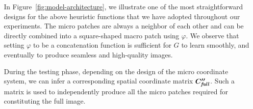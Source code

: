 \documentclass{article}
\makeatletter
\newcommand{\modelName}{COCO-GAN }
\DeclareRobustCommand\onedot{\futurelet\@let@token\@onedot}
\def\@onedot{\ifx\@let@token.\else.\null\fi\xspace}
\def\eg{\emph{e.g}\onedot} \def\Eg{\emph{E.g}\onedot}
\makeatother
\begin{document}
    In Figure~\ref{fig:model-architecture}, we illustrate one of the most straightforward designs for the above heuristic functions that we have adopted throughout our experiments. The micro patches are always a neighbor of each other and can be directly combined into a square-shaped macro patch using $\varphi$.
We observe that setting $\varphi$ to be a concatenation function is sufficient for $G$ to learn smoothly, and eventually to produce seamless and high-quality images.

    During the testing phase, depending on the design of the micro coordinate system, we can infer a corresponding spatial coordinate matrix $\bm{C''}_{\textbf{\textit{full}}}$. Such a matrix is used to independently produce all the micro patches required for constituting the full image. 

\begin{figure*}[t]
\centering
        \begin{minipage}[t]{0.485\linewidth}
             \\[-0.8em]
        \end{minipage}
        \hfill
        \begin{minipage}[t]{0.485\linewidth}
             \\[-0.8em]
        \end{minipage}
        \caption{\modelName generates visually smooth and globally coherent full images without any post-processing. The three rows from top to bottom show: (a) the generated full images, (b) macro patches, and (c) micro patches. For the first five columns, each column uses the same latent vector, \eg, the leftmost full image (first row), the leftmost micro patch (second row), and the leftmost micro patch (third row) share the same latent vector. Note that the columns are not aligned due to different sizes. More results can be found in the Appendix~\ref{appendix:more-full-images}.}
        \label{fig:generation-basic}
        \vspace{-0.5em}
    \end{figure*}
    
\end{document}
